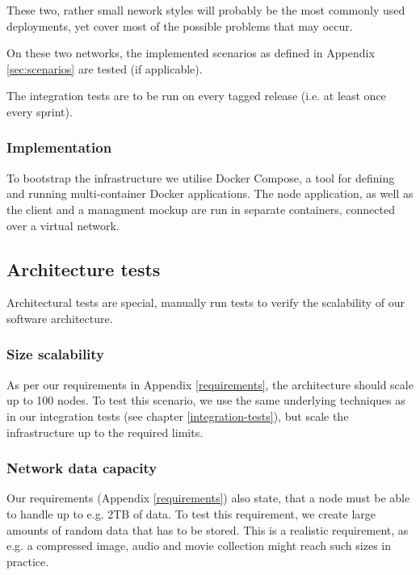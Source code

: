 These two, rather small nework styles will probably be the most commonly used deployments, yet cover most of the possible problems that may occur.

On these two networks, the implemented scenarios as defined in Appendix \ref{sec:scenarios} are tested (if applicable).

The integration tests are to be run on every tagged release (i.e. at least once every sprint).

\subsubsection{Implementation}

To bootstrap the infrastructure we utilise Docker Compose, a tool for defining and running multi-container Docker applications\cite{docker-compose}. The node application, as well as the client and a managment mockup are run in separate containers, connected over a virtual network.

\subsection{Architecture tests}

Architectural tests are special, manually run tests to verify the scalability of our software architecture.

\subsubsection{Size scalability}
As per our requirements in Appendix \ref{requirements}, the architecture should scale up to 100 nodes. To test this scenario, we use the same underlying techniques as in our integration tests (see chapter \ref{integration-tests}), but scale the infrastructure up to the required limits.

\subsubsection{Network data capacity}
Our requirements (Appendix \ref{requirements}) also state, that a node must be able to handle up to e.g. 2TB of data. To test this requirement, we create large amounts of random data that has to be stored. This is a realistic requirement, as e.g. a compressed image, audio and movie collection might reach such sizes in practice.
